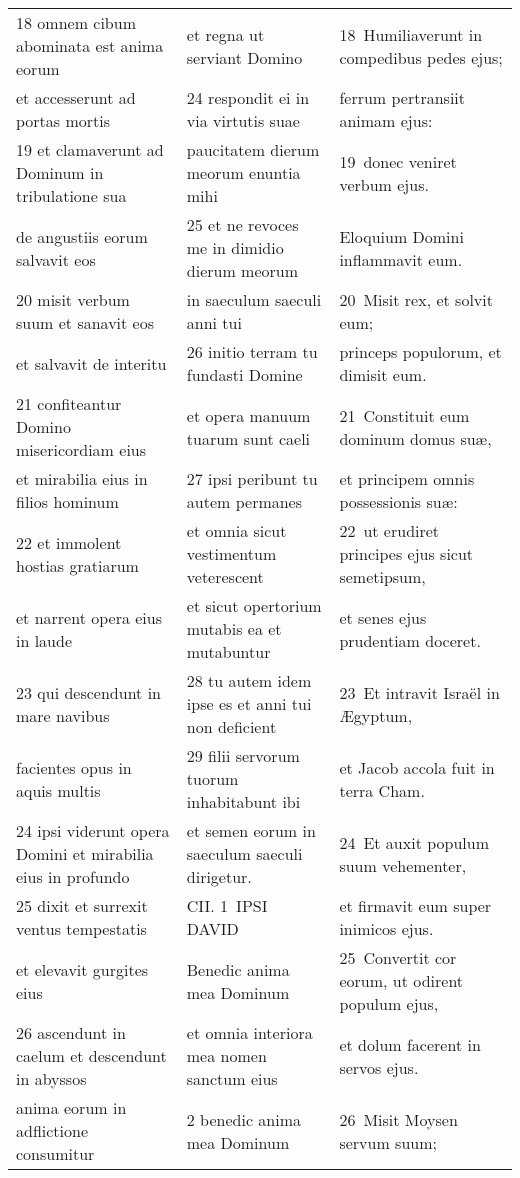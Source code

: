 \documentclass{article}
\begin{document}
\begin{longtable}{@{}p{}p{}p{}@{}}
18 omnem cibum abominata est anima eorum	&	et regna ut serviant Domino	&	18 Humiliaverunt in compedibus pedes ejus;	\\
et accesserunt ad portas mortis	&	24 respondit ei in via virtutis suae	&	ferrum pertransiit animam ejus:	\\
19 et clamaverunt ad Dominum in tribulatione sua	&	paucitatem dierum meorum enuntia mihi	&	19 donec veniret verbum ejus.	\\
de angustiis eorum salvavit eos	&	25 et ne revoces me in dimidio dierum meorum	&	Eloquium Domini inflammavit eum.	\\
20 misit verbum suum et sanavit eos	&	in saeculum saeculi anni tui	&	20 Misit rex, et solvit eum;	\\
et salvavit de interitu	&	26 initio terram tu fundasti Domine	&	princeps populorum, et dimisit eum.	\\
21 confiteantur Domino misericordiam eius	&	et opera manuum tuarum sunt caeli	&	21 Constituit eum dominum domus suæ,	\\
et mirabilia eius in filios hominum	&	27 ipsi peribunt tu autem permanes	&	et principem omnis possessionis suæ:	\\
22 et immolent hostias gratiarum	&	et omnia sicut vestimentum veterescent	&	22 ut erudiret principes ejus sicut semetipsum,	\\
et narrent opera eius in laude	&	et sicut opertorium mutabis ea et mutabuntur	&	et senes ejus prudentiam doceret.	\\
23 qui descendunt in mare navibus	&	28 tu autem idem ipse es et anni tui non deficient	&	23 Et intravit Israël in Ægyptum,	\\
facientes opus in aquis multis	&	29 filii servorum tuorum inhabitabunt ibi	&	et Jacob accola fuit in terra Cham.	\\
24 ipsi viderunt opera Domini et mirabilia eius in profundo	&	et semen eorum in saeculum saeculi dirigetur.	&	24 Et auxit populum suum vehementer,	\\
25 dixit et surrexit ventus tempestatis	&	CII. 1 IPSI DAVID	&	et firmavit eum super inimicos ejus.	\\
et elevavit gurgites eius	&	Benedic anima mea Dominum	&	25 Convertit cor eorum, ut odirent populum ejus,	\\
26 ascendunt in caelum et descendunt in abyssos	&	et omnia interiora mea nomen sanctum eius	&	et dolum facerent in servos ejus.	\\
anima eorum in adflictione consumitur	&	2 benedic anima mea Dominum	&	26 Misit Moysen servum suum;	\\

\end{longtable}
\end{document}
